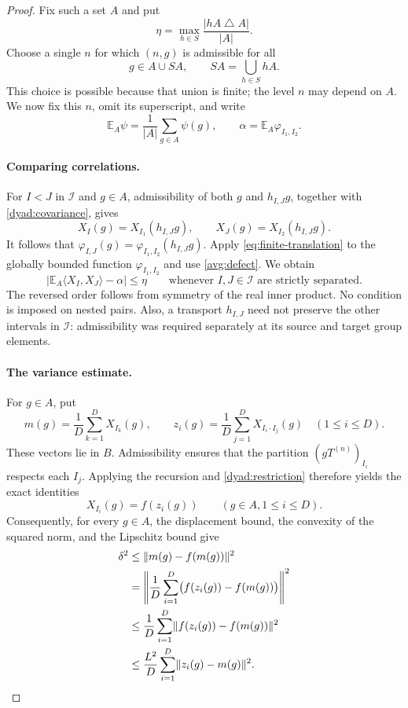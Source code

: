 \documentclass[11pt]{article}
\newcommand{\norm}[1]{\lVert #1\rVert}
\newcommand{\ip}[2]{\langle #1,#2\rangle}
\theoremstyle{definition}
\numberwithin{equation}{section}
\begin{document}
\begin{proof}
Fix such a set $A$ and put
\begin{equation}\label{avg:defect}
  \eta=\max_{h\in S}\frac{|hA\mathbin{\triangle}A|}{|A|}.
\end{equation}
Choose a single $n$ for which $(n,g)$ is admissible for all
\[
  g\in A\cup SA,
  \qquad SA=\bigcup_{h\in S}hA.
\]
This choice is possible because that union is finite; the level $n$
may depend on $A$.  We now fix this $n$, omit its superscript, and write
\[
  \mathbb E_A\psi=\frac1{|A|}\sum_{g\in A}\psi(g),
  \qquad
  \alpha=\mathbb E_A\varphi_{I_1,I_2}.
\]
\paragraph{Comparing correlations.}
For $I<J$ in $\mathcal I$ and $g\in A$, admissibility of both $g$
and $h_{I,J}g$, together with \eqref{dyad:covariance}, gives
\[
  X_I(g)=X_{I_1}(h_{I,J}g),\qquad
  X_J(g)=X_{I_2}(h_{I,J}g).
\]
It follows that $\varphi_{I,J}(g)
=\varphi_{I_1,I_2}(h_{I,J}g)$.  Apply
\eqref{eq:finite-translation} to the globally bounded function
$\varphi_{I_1,I_2}$ and use \eqref{avg:defect}.  We obtain
\begin{equation}\label{avg:correlation}
  \left|\mathbb E_A\ip{X_I}{X_J}-\alpha\right|
       \leq\eta
  \qquad\text{whenever $I,J\in\mathcal I$ are strictly separated}.
\end{equation}
The reversed order follows from symmetry of the real inner
product.  No condition is imposed on nested pairs.  Also, a
transport $h_{I,J}$ need not preserve the other intervals in
$\mathcal I$: admissibility was required separately at its source
and target group elements.

\paragraph{The variance estimate.}

For $g\in A$, put
\[
  m(g)=\frac1D\sum_{k=1}^D X_{I_k}(g),\qquad
  z_i(g)=\frac1D\sum_{j=1}^D X_{I_i\cdot I_j}(g)
       \quad(1\leq i\leq D).
\]
These vectors lie in $B$.  Admissibility ensures that the partition
$(gT^{(n)})_{I_i}$ respects each $I_j$.  Applying the recursion and
\eqref{dyad:restriction} therefore yields the exact identities
\begin{equation}\label{avg:recursive-identity}
  X_{I_i}(g)=f(z_i(g))\qquad(g\in A, 1\leq i\leq D).
\end{equation}
Consequently, for every $g\in A$, the displacement bound, the
convexity of the squared norm, and the Lipschitz bound give
\begin{align}
  \delta^2
  &\leq\norm{m(g)-f(m(g))}^2\notag\\
  &=\left\|\frac1D\sum_{i=1}^D
                   \bigl(f(z_i(g))-f(m(g))\bigr)\right\|^2\notag\\
  &\leq\frac1D\sum_{i=1}^D
                   \norm{f(z_i(g))-f(m(g))}^2\notag\\
  &\leq\frac{L^2}{D}\sum_{i=1}^D\norm{z_i(g)-m(g)}^2.
       \label{avg:displacement}
\end{align}


\end{proof}
\end{document}
